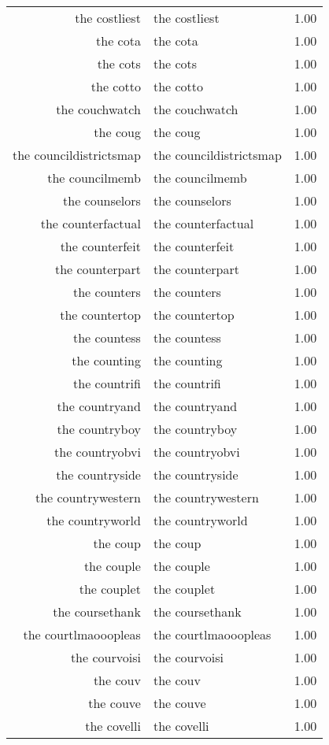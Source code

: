 \begin{table}[ht]
\begin{tabular}{rlr}
  the costliest & the costliest & 1.00 \\ 
  the cota & the cota & 1.00 \\ 
  the cots & the cots & 1.00 \\ 
  the cotto & the cotto & 1.00 \\ 
  the couchwatch & the couchwatch & 1.00 \\ 
  the coug & the coug & 1.00 \\ 
  the councildistrictsmap & the councildistrictsmap & 1.00 \\ 
  the councilmemb & the councilmemb & 1.00 \\ 
  the counselors & the counselors & 1.00 \\ 
  the counterfactual & the counterfactual & 1.00 \\ 
  the counterfeit & the counterfeit & 1.00 \\ 
  the counterpart & the counterpart & 1.00 \\ 
  the counters & the counters & 1.00 \\ 
  the countertop & the countertop & 1.00 \\ 
  the countess & the countess & 1.00 \\ 
  the counting & the counting & 1.00 \\ 
  the countrifi & the countrifi & 1.00 \\ 
  the countryand & the countryand & 1.00 \\ 
  the countryboy & the countryboy & 1.00 \\ 
  the countryobvi & the countryobvi & 1.00 \\ 
  the countryside & the countryside & 1.00 \\ 
  the countrywestern & the countrywestern & 1.00 \\ 
  the countryworld & the countryworld & 1.00 \\ 
  the coup & the coup & 1.00 \\ 
  the couple & the couple & 1.00 \\ 
  the couplet & the couplet & 1.00 \\ 
  the coursethank & the coursethank & 1.00 \\ 
  the courtlmaooopleas & the courtlmaooopleas & 1.00 \\ 
  the courvoisi & the courvoisi & 1.00 \\ 
  the couv & the couv & 1.00 \\ 
  the couve & the couve & 1.00 \\ 
  the covelli & the covelli & 1.00 \\ 

\end{tabular}
\end{table}
